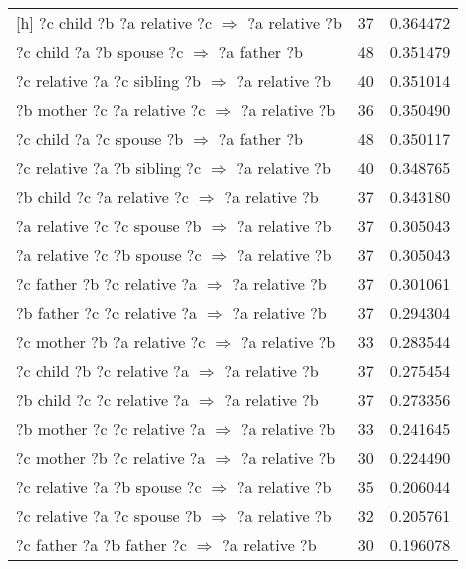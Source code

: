 \begin{longtable}{lrr}[h]
   ?c  child  ?b  ?a  relative  ?c   $\Rightarrow$ ?a  relative  ?b &           37 &        0.364472 \\
       ?c  child  ?a  ?b  spouse  ?c   $\Rightarrow$ ?a  father  ?b &           48 &        0.351479 \\
 ?c  relative  ?a  ?c  sibling  ?b   $\Rightarrow$ ?a  relative  ?b &           40 &        0.351014 \\
  ?b  mother  ?c  ?a  relative  ?c   $\Rightarrow$ ?a  relative  ?b &           36 &        0.350490 \\
       ?c  child  ?a  ?c  spouse  ?b   $\Rightarrow$ ?a  father  ?b &           48 &        0.350117 \\
 ?c  relative  ?a  ?b  sibling  ?c   $\Rightarrow$ ?a  relative  ?b &           40 &        0.348765 \\
   ?b  child  ?c  ?a  relative  ?c   $\Rightarrow$ ?a  relative  ?b &           37 &        0.343180 \\
  ?a  relative  ?c  ?c  spouse  ?b   $\Rightarrow$ ?a  relative  ?b &           37 &        0.305043 \\
  ?a  relative  ?c  ?b  spouse  ?c   $\Rightarrow$ ?a  relative  ?b &           37 &        0.305043 \\
  ?c  father  ?b  ?c  relative  ?a   $\Rightarrow$ ?a  relative  ?b &           37 &        0.301061 \\
  ?b  father  ?c  ?c  relative  ?a   $\Rightarrow$ ?a  relative  ?b &           37 &        0.294304 \\
  ?c  mother  ?b  ?a  relative  ?c   $\Rightarrow$ ?a  relative  ?b &           33 &        0.283544 \\
   ?c  child  ?b  ?c  relative  ?a   $\Rightarrow$ ?a  relative  ?b &           37 &        0.275454 \\
   ?b  child  ?c  ?c  relative  ?a   $\Rightarrow$ ?a  relative  ?b &           37 &        0.273356 \\
  ?b  mother  ?c  ?c  relative  ?a   $\Rightarrow$ ?a  relative  ?b &           33 &        0.241645 \\
  ?c  mother  ?b  ?c  relative  ?a   $\Rightarrow$ ?a  relative  ?b &           30 &        0.224490 \\
  ?c  relative  ?a  ?b  spouse  ?c   $\Rightarrow$ ?a  relative  ?b &           35 &        0.206044 \\
  ?c  relative  ?a  ?c  spouse  ?b   $\Rightarrow$ ?a  relative  ?b &           32 &        0.205761 \\
    ?c  father  ?a  ?b  father  ?c   $\Rightarrow$ ?a  relative  ?b &           30 &        0.196078 \\

\end{longtable}
